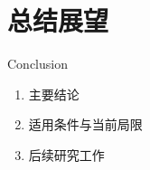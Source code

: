 \documentclass[aspectratio=43,11pt,t]{beamer}
\begin{document}
\section{总结展望}
\begin{frame}{Conclusion}
  \begin{enumerate}
    \item 主要结论
    \item 适用条件与当前局限
    \item 后续研究工作
  \end{enumerate}
\end{frame}

\SYSUthanksframe
\end{document}
